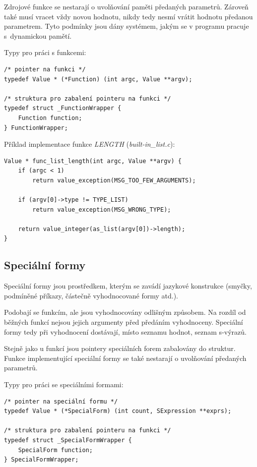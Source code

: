 \documentclass[12pt, a4paper]{report}
\begin{document}
Zdrojové funkce se nestarají o uvolňování paměti předaných parametrů.
Zároveň také musí vracet vždy novou hodnotu, nikdy tedy nesmí vrátit hodnotu předanou parametrem.
Tyto podmínky jsou dány systémem, jakým se v programu pracuje s~dynamickou pamětí.

\pagebreak[2]

\noindent
Typy pro práci s funkcemi:
\begin{lstlisting}
/* pointer na funkci */
typedef Value * (*Function) (int argc, Value **argv);

/* struktura pro zabalení pointeru na funkci */
typedef struct _FunctionWrapper {
    Function function;
} FunctionWrapper;
\end{lstlisting}

\vspace{2ex}
\noindent
Příklad implementace funkce \emph{LENGTH} (\emph{built-in\_list.c}):
\begin{lstlisting}
Value * func_list_length(int argc, Value **argv) {
    if (argc < 1)
        return value_exception(MSG_TOO_FEW_ARGUMENTS);

    if (argv[0]->type != TYPE_LIST)
        return value_exception(MSG_WRONG_TYPE);

    return value_integer(as_list(argv[0])->length);
}
\end{lstlisting}

\subsection{Speciální formy}
Speciální formy jsou prostředkem, kterým se zavádí jazykové konstrukce (smyčky, podmíněné příkazy, částečně vyhodnocované formy atd.).

Podobají se funkcím, ale jsou vyhodnocovány odlišným způsobem. Na rozdíl od běžných funkcí nejsou jejich argumenty před předáním vyhodnoceny. Speciální formy tedy při vyhodnocení dostávají, místo seznamu hodnot, seznam s-výrazů.

Stejně jako u  funkcí jsou pointery speciálních forem zabalovány do struktur. Funkce implementující speciální formy se také nestarají o uvolňování předaných parametrů.

\vspace{2ex}
\noindent
Typy pro práci se speciálními formami:\begin{lstlisting}
/* pointer na speciální formu */
typedef Value * (*SpecialForm) (int count, SExpression **exprs);

/* struktura pro zabalení pointeru na funkci */
typedef struct _SpecialFormWrapper {
    SpecialForm function;
} SpecialFormWrapper;
\end{lstlisting}
\end{document}
